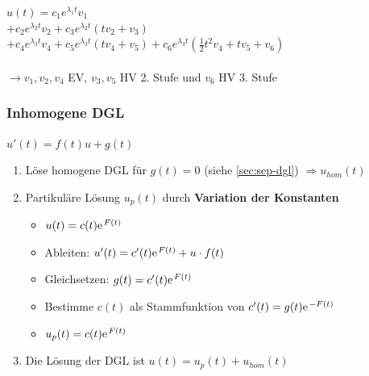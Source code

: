 \documentclass[6pt,a4paper]{scrartcl}
\renewcommand{\emph}[1]{\textbf{#1}}															%
\newcommand{\ra}[0]{\ensuremath{\rightarrow}} 									%
\begin{document}
\begin{multicols*}{4}
$u (t) = c_1 e^{\lambda_1 t} v_1$ \\
$+ c_2 e^{\lambda_2 t} v_2 + c_3 e^{\lambda_2 t}(tv_2 + v_3)$ \\
$+ c_4 e^{\lambda_3 t} v_4 + c_5 e^{\lambda_3 t}(tv_4 + v_5) + c_6 e^{\lambda_3 t} (\frac{1}{2} t^2 v_4 + tv_5 + v_6)$ \\
\\ \ra  $v_1, v_2, v_4$ EV, $v_3, v_5$ HV 2. Stufe und $v_6$ HV 3. Stufe
\fi
\subsubsection{Inhomogene DGL}
$\boxed{u'(t) = f(t)u + g(t)}$

\begin{enumerate}
	\itemsep0pt 
	\item Löse homogene DGL für $g(t) = 0$ (siehe \ref{sec:sep-dgl}) $\Rightarrow u_{hom}(t)$
	\item Partikuläre Lösung $u_p(t)$ durch \emph{Variation der Konstanten}
	\begin{itemize}\itemsep0pt 
		\item $u(t) = c(t) \e^{F(t)}$
		\item Ableiten: $u'(t) = c'(t)\e^{F(t)}+u\cdot f(t)$
		\item Gleichsetzen: $g(t) = c'(t)\e^{F(t)}$
		\item Bestimme $c(t)$ als Stammfunktion von $c'(t) = g(t)\e^{-F(t)}$
		\item $u_p(t) = c(t)\e^{F(t)}$
	\end{itemize}
	\item Die Lösung der DGL ist $u(t) = u_p(t) + u_{hom}(t)$
\end{enumerate}


\end{multicols*}
\end{document}
